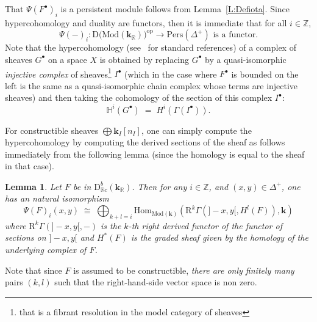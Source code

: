 \documentclass[a4paper, english, 11pt]{article}
\newcommand{\kk}[0]{\textbf{k}}
\newcommand{\Mod}[0]{\text{Mod}}
\newcommand{\0}{\vec{0}}
\newcommand{\R}[0]{\mathbb{R}}
\newcommand{\Z}[0]{\mathbb{Z}}
\newcommand{\D}[0]{\text{D}}
\newcommand{\op}[0]{\text{op}}
\newcommand{\Hom}[0]{\text{Hom}}
\newcommand{\Pers}[0]{\text{Pers}}
\newcommand{\Rr}[0]{\text{R}}
\newtheorem{lem}[prop]{Lemma}
\begin{document}
\smallskip

That $\Psi(F^\bullet)_i$ is a persistent module follows from Lemma~\ref{L:Defiota}. Since hypercohomology and duality are functors, then it is immediate that for all $i\in \Z$,
\begin{equation}
 \Psi(-)_i: \D \big(\Mod(\kk_{\mathbb{R}})\big)^{\op} \longrightarrow \Pers(\Delta^+) \mbox{ is a functor.}
\end{equation}
 Note that the hypercohomology (see~\cite{DanilovHyperhomology, Tohoku} for standard references) of a complex of sheaves $G^\bullet$ on a space $X$ is obtained by replacing $G^\bullet$ by a quasi-isomorphic \emph{injective complex} of sheaves\footnote{that is a fibrant resolution in the model category of sheaves} $I^\bullet$ (which in the case where $F^\bullet$ is bounded on the left is the same as a quasi-isomorphic chain complex whose terms are injective sheaves) and then taking the cohomology of the section of this  complex $I^\bullet$: 
  $$\mathbb{H}^i(G^\bullet)\; =\; H^i( \Gamma(I^\bullet)) .$$

  \smallskip 
  
For constructible sheaves $\bigoplus \kk_{I}[n_I]$, one can simply compute the hypercohomology by  computing the derived sections of the sheaf as follows immediately from the following lemma (since the homology is equal to the sheaf in that case).  
\begin{lem}\label{L:DefadnFunctorialityPsi}
 Let $F$ be in $\D^b_{\R c}(\kk_\R)$. Then for any $i\in \Z$, and $(x,y)\in \Delta^+$, one has an natural isomorphism
 \begin{equation}\label{eq:Psifocosntructible}\Psi(F)_i(x,y)\; \cong\; \bigoplus_{k+l = i} \Hom_{\Mod(\kk)}\left ( \Rr^k\Gamma \left ( ]-x,y[ ,  H^l(F)\right ), \kk \right )  \end{equation}
 where $\Rr^k\Gamma \left ( ]-x,y[ , -\right )$ is the $k$-th right derived functor of the functor of sections on $]-x,y[$ and $H^*(F)$ is the graded sheaf given by the homology of the underlying complex of $F$. 
\end{lem}
Note that since $F$ is assumed to be constructible, \emph{there are only finitely many} pairs $(k,l)$ such that the right-hand-side vector space is non zero.
\end{document}
